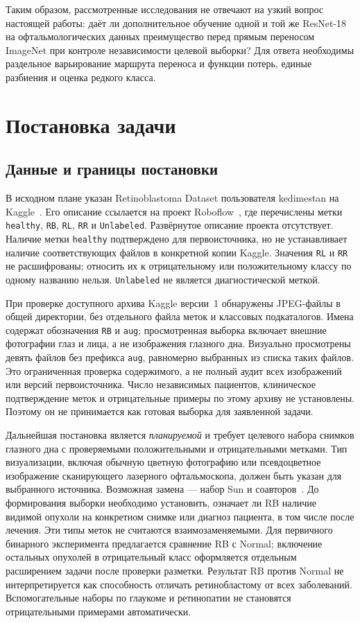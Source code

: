\documentclass{misisarticle}
\begin{document}
Таким образом, рассмотренные исследования не отвечают на узкий вопрос настоящей работы: даёт ли дополнительное обучение одной и той же ResNet-18 на офтальмологических данных преимущество перед прямым переносом ImageNet при контроле независимости целевой выборки? Для ответа необходимы раздельное варьирование маршрута переноса и функции потерь, единые разбиения и оценка редкого класса.

\section{Постановка задачи}
\subsection{Данные и границы постановки}
В исходном плане указан Retinoblastoma Dataset пользователя kedimestan на Kaggle~\cite{rbkaggle}. Его описание ссылается на проект Roboflow~\cite{rbroboflow}, где перечислены метки \texttt{healthy}, \texttt{RB}, \texttt{RL}, \texttt{RR} и \texttt{Unlabeled}. Развёрнутое описание проекта отсутствует. Наличие метки \texttt{healthy} подтверждено для первоисточника, но не устанавливает наличие соответствующих файлов в конкретной копии Kaggle. Значения \texttt{RL} и \texttt{RR} не расшифрованы; относить их к отрицательному или положительному классу по одному названию нельзя. \texttt{Unlabeled} не является диагностической меткой.

При проверке доступного архива Kaggle версии~1 обнаружены JPEG-файлы в общей директории, без отдельного файла меток и классовых подкаталогов. Имена содержат обозначения \texttt{RB} и \texttt{aug}; просмотренная выборка включает внешние фотографии глаз и лица, а не изображения глазного дна. Визуально просмотрены девять файлов без префикса \texttt{aug}, равномерно выбранных из списка таких файлов. Это ограниченная проверка содержимого, а не полный аудит всех изображений или версий первоисточника. Число независимых пациентов, клиническое подтверждение меток и отрицательные примеры по этому архиву не установлены. Поэтому он не принимается как готовая выборка для заявленной задачи.

Дальнейшая постановка является \emph{планируемой} и требует целевого набора снимков глазного дна с проверяемыми положительными и отрицательными метками. Тип визуализации, включая обычную цветную фотографию или псевдоцветное изображение сканирующего лазерного офтальмоскопа, должен быть указан для выбранного источника. Возможная замена --- набор Sun и соавторов~\cite{sun2025}. До формирования выборки необходимо установить, означает ли RB наличие видимой опухоли на конкретном снимке или диагноз пациента, в том числе после лечения. Эти типы меток не считаются взаимозаменяемыми. Для первичного бинарного эксперимента предлагается сравнение RB с Normal; включение остальных опухолей в отрицательный класс оформляется отдельным расширением задачи после проверки разметки. Результат RB против Normal не интерпретируется как способность отличать ретинобластому от всех заболеваний. Вспомогательные наборы по глаукоме и ретинопатии не становятся отрицательными примерами автоматически.
\end{document}
